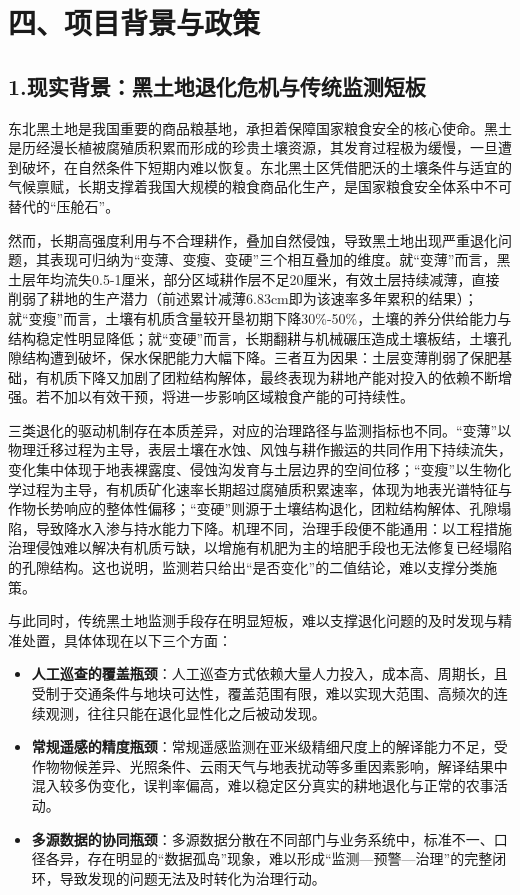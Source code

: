 \section{四、项目背景与政策}

\subsection{1.现实背景：黑土地退化危机与传统监测短板}

东北黑土地是我国重要的商品粮基地，承担着保障国家粮食安全的核心使命。黑土是历经漫长植被腐殖质积累而形成的珍贵土壤资源，其发育过程极为缓慢，一旦遭到破坏，在自然条件下短期内难以恢复。东北黑土区凭借肥沃的土壤条件与适宜的气候禀赋，长期支撑着我国大规模的粮食商品化生产，是国家粮食安全体系中不可替代的“压舱石”。

然而，长期高强度利用与不合理耕作，叠加自然侵蚀，导致黑土地出现严重退化问题，其表现可归纳为“变薄、变瘦、变硬”三个相互叠加的维度。就“变薄”而言，黑土层年均流失0.5-1厘米，部分区域耕作层不足20厘米，有效土层持续减薄，直接削弱了耕地的生产潜力（前述累计减薄6.83cm即为该速率多年累积的结果）；就“变瘦”而言，土壤有机质含量较开垦初期下降30\%-50\%，土壤的养分供给能力与结构稳定性明显降低；就“变硬”而言，长期翻耕与机械碾压造成土壤板结，土壤孔隙结构遭到破坏，保水保肥能力大幅下降。三者互为因果：土层变薄削弱了保肥基础，有机质下降又加剧了团粒结构解体，最终表现为耕地产能对投入的依赖不断增强。若不加以有效干预，将进一步影响区域粮食产能的可持续性。

三类退化的驱动机制存在本质差异，对应的治理路径与监测指标也不同。“变薄”以物理迁移过程为主导，表层土壤在水蚀、风蚀与耕作搬运的共同作用下持续流失，变化集中体现于地表裸露度、侵蚀沟发育与土层边界的空间位移；“变瘦”以生物化学过程为主导，有机质矿化速率长期超过腐殖质积累速率，体现为地表光谱特征与作物长势响应的整体性偏移；“变硬”则源于土壤结构退化，团粒结构解体、孔隙塌陷，导致降水入渗与持水能力下降。机理不同，治理手段便不能通用：以工程措施治理侵蚀难以解决有机质亏缺，以增施有机肥为主的培肥手段也无法修复已经塌陷的孔隙结构。这也说明，监测若只给出“是否变化”的二值结论，难以支撑分类施策。

与此同时，传统黑土地监测手段存在明显短板，难以支撑退化问题的及时发现与精准处置，具体体现在以下三个方面：

\begin{itemize}
    \item \textbf{人工巡查的覆盖瓶颈}：人工巡查方式依赖大量人力投入，成本高、周期长，且受制于交通条件与地块可达性，覆盖范围有限，难以实现大范围、高频次的连续观测，往往只能在退化显性化之后被动发现。
    \item \textbf{常规遥感的精度瓶颈}：常规遥感监测在亚米级精细尺度上的解译能力不足，受作物物候差异、光照条件、云雨天气与地表扰动等多重因素影响，解译结果中混入较多伪变化，误判率偏高，难以稳定区分真实的耕地退化与正常的农事活动。
    \item \textbf{多源数据的协同瓶颈}：多源数据分散在不同部门与业务系统中，标准不一、口径各异，存在明显的“数据孤岛”现象，难以形成“监测—预警—治理”的完整闭环，导致发现的问题无法及时转化为治理行动。
\end{itemize}

